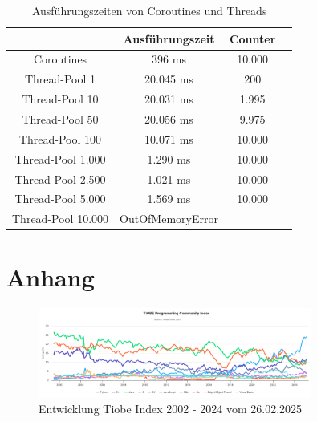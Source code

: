 \documentclass[11pt]{article}
\begin{document}
    \begin{table}[h!]
        \centering
        \begin{tabular}{|c|c|c|c|}
            \hline
             & \textbf{Ausführungszeit} & \textbf{Counter}\\
            \hline
            Coroutines & 396 ms & 10.000   \\
            \hline
            Thread-Pool 1 & 20.045 ms  & 200  \\
            \hline
            Thread-Pool 10 & 20.031 ms  & 1.995  \\
            \hline
            Thread-Pool 50 & 20.056 ms  & 9.975  \\
            \hline
            Thread-Pool 100 & 10.071 ms  & 10.000  \\
            \hline
            Thread-Pool 1.000 & 1.290 ms  & 10.000  \\
            \hline
            Thread-Pool 2.500 & 1.021 ms  & 10.000  \\
            \hline
            Thread-Pool 5.000 & 1.569 ms  & 10.000  \\
            \hline
            Thread-Pool 10.000 & OutOfMemoryError  &   \\
            \hline
        \end{tabular}
        \caption{Ausführungszeiten von Coroutines und Threads}
        \label{tab:coroutine-thread-pool}
    \end{table}

    \printbibliography[
        heading=bibintoc,
        title={Literaturverzeichnis}
    ]
    \appendix
    \section{Anhang}

    \begin{figure}[h]
        \centering
        \includegraphics[width=0.8\textwidth]{pictures/Screenshot 2025-02-26 at 19-53-49 TIOBE Index - TIOBE}
        \caption{Entwicklung Tiobe Index 2002 - 2024 vom 26.02.2025 }
        \label{fig:entwicklung-tiobe}
    \end{figure}
\end{document}

